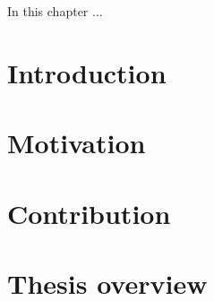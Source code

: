 In this chapter ...

\section{Introduction}
\label{ch:intro/intro}


\section{Motivation}
\label{ch:intro/motiv}


\section{Contribution}
\label{ch:intro/contri}


\section{Thesis overview}
\label{ch:intro/overview}
